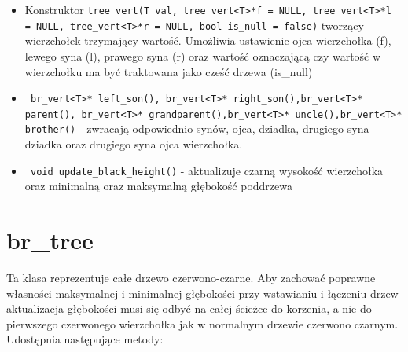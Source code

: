 \documentclass[declaration,shortabstract]{iithesis}
\theoremstyle{thm}
\theoremstyle{remark}
\theoremstyle{plain}
\theoremstyle{plain}
\theoremstyle{plain}
\begin{document}
\begin{itemize}

\item{Konstruktor \texttt{tree\_vert(T val, tree\_vert<T>*f = NULL, tree\_vert<T>*l = NULL, tree\_vert<T>*r = NULL, bool is\_null = false)} tworzący wierzchołek trzymający wartość. Umożliwia ustawienie ojca wierzchołka (f), lewego syna (l), prawego syna (r) oraz wartość oznaczającą czy wartość w wierzchołku ma być traktowana jako cześć drzewa (is\_null)}

\item{\texttt{  br\_vert<T>* left\_son(), br\_vert<T>* right\_son(),br\_vert<T>* parent(), br\_vert<T>* grandparent(),br\_vert<T>* uncle(),br\_vert<T>* brother()} - zwracają odpowiednio synów, ojca, dziadka, drugiego syna dziadka oraz drugiego syna ojca wierzchołka. }
    
\item{\texttt{ void update\_black\_height()} - aktualizuje czarną wysokość wierzchołka oraz minimalną oraz maksymalną głębokość poddrzewa}

\end{itemize}

\section{br\_tree}

Ta klasa reprezentuje całe drzewo czerwono-czarne. Aby zachować poprawne własności maksymalnej i minimalnej głębokości przy wstawianiu i łączeniu drzew aktualizacja głębokości musi się odbyć na całej ścieżce do korzenia, a nie do pierwszego czerwonego wierzchołka jak w normalnym drzewie czerwono czarnym. Udostępnia następujące metody: 
\end{document}
